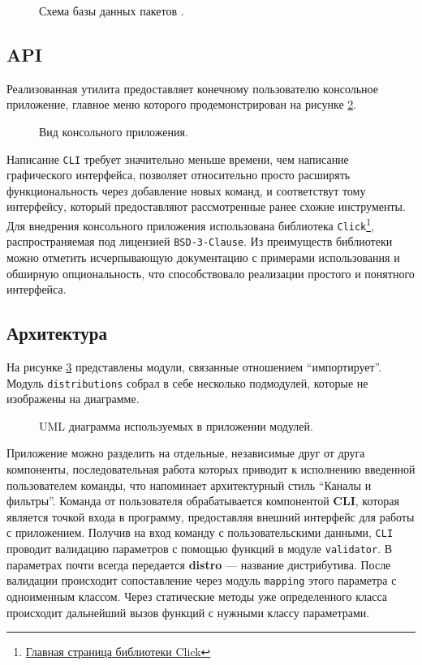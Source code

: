 \begin{figure}
	\centering
	
	\caption{Схема базы данных пакетов {\ubuntu}.}
	\label{bd:schema}
\end{figure}

\subsection{API}
Реализованная утилита предоставляет конечному пользователю консольное приложение, главное меню которого продемонстрирован на рисунке \ref{cli}.

\begin{figure}[ht]
	\centering
	
	\caption{Вид консольного приложения.}
	\label{cli}
\end{figure}

Написание \texttt{CLI} требует значительно меньше времени, чем написание графического интерфейса, позволяет относительно просто расширять функциональность через добавление новых команд, и соответствут тому интерфейсу, который предоставляют рассмотренные ранее схожие инструменты.
Для внедрения консольного приложения использована библиотека \texttt{Click}\footnote{\href{https://click.palletsprojects.com/en/8.1.x/}{Главная страница библиотеки Click}}, распространяемая под лицензией \texttt{BSD-3-Clause}.
Из преимуществ библиотеки можно отметить исчерпывающую документацию с примерами использования и обширную опциональность, что способствовало реализации простого и понятного интерфейса.

\subsection{Архитектура}
На рисунке \ref{uml:packages} представлены модули, связанные отношением \enquote{импортирует}.
Модуль \texttt{distributions} собрал в себе несколько подмодулей, которые не изображены на диаграмме.

\begin{figure}[ht]
	\centering
	
	\caption{UML диаграмма используемых в приложении модулей.}
	\label{uml:packages}
\end{figure}

Приложение можно разделить на отдельные, независимые друг от друга компоненты, последовательная работа которых приводит к исполнению введенной пользователем команды, что напоминает архитектурный стиль \enquote{Каналы и фильтры}.
Команда от пользователя обрабатывается компонентой \textbf{CLI}, которая является точкой входа в программу, предоставляя внешний интерфейс для работы с приложением.
Получив на вход команду с пользовательскими данными, \texttt{CLI} проводит валидацию параметров с помощью функций в модуле \texttt{validator}. В параметрах почти всегда передается \textbf{distro} --- название дистрибутива. После валидации происходит сопоставление через модуль \texttt{mapping} этого параметра с одноименным классом.
Через статические методы уже определенного класса происходит дальнейший вызов функций с нужными классу параметрами.

